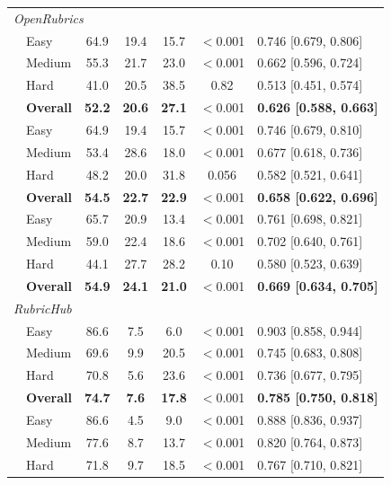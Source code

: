 \documentclass{article}
\begin{document}
\begin{table}[!h]
\begin{tabular}{llccccl}
\midrule
\multicolumn{7}{l}{\textit{OpenRubrics}} \\
\addlinespace[1pt]
\multirow{4}{*}{Qwen3-14B}
 & Easy    & 64.9 & 19.4 & 15.7 & $<$0.001 & 0.746 [0.679, 0.806] \\
 & Medium  & 55.3 & 21.7 & 23.0 & $<$0.001 & 0.662 [0.596, 0.724] \\
 & Hard    & 41.0 & 20.5 & 38.5 & 0.82     & 0.513 [0.451, 0.574] \\
 & \textbf{Overall} & \textbf{52.2} & \textbf{20.6} & \textbf{27.1} & $<$0.001 & \textbf{0.626 [0.588, 0.663]} \\
\addlinespace[3pt]
\multirow{4}{*}{Llama3-70B}
 & Easy    & 64.9 & 19.4 & 15.7 & $<$0.001 & 0.746 [0.679, 0.810] \\
 & Medium  & 53.4 & 28.6 & 18.0 & $<$0.001 & 0.677 [0.618, 0.736] \\
 & Hard    & 48.2 & 20.0 & 31.8 & 0.056    & 0.582 [0.521, 0.641] \\
 & \textbf{Overall} & \textbf{54.5} & \textbf{22.7} & \textbf{22.9} & $<$0.001 & \textbf{0.658 [0.622, 0.696]} \\
\addlinespace[3pt]
\multirow{4}{*}{GPT-4.1}
 & Easy    & 65.7 & 20.9 & 13.4 & $<$0.001 & 0.761 [0.698, 0.821] \\
 & Medium  & 59.0 & 22.4 & 18.6 & $<$0.001 & 0.702 [0.640, 0.761] \\
 & Hard    & 44.1 & 27.7 & 28.2 & 0.10     & 0.580 [0.523, 0.639] \\
 & \textbf{Overall} & \textbf{54.9} & \textbf{24.1} & \textbf{21.0} & $<$0.001 & \textbf{0.669 [0.634, 0.705]} \\
\midrule
\multicolumn{7}{l}{\textit{RubricHub}} \\
\addlinespace[1pt]
\multirow{4}{*}{Qwen3-14B}
 & Easy    & 86.6 &  7.5 &  6.0 & $<$0.001 & 0.903 [0.858, 0.944] \\
 & Medium  & 69.6 &  9.9 & 20.5 & $<$0.001 & 0.745 [0.683, 0.808] \\
 & Hard    & 70.8 &  5.6 & 23.6 & $<$0.001 & 0.736 [0.677, 0.795] \\
 & \textbf{Overall} & \textbf{74.7} & \textbf{7.6} & \textbf{17.8} & $<$0.001 & \textbf{0.785 [0.750, 0.818]} \\
\addlinespace[3pt]
\multirow{4}{*}{Llama3-70B}
 & Easy    & 86.6 &  4.5 &  9.0 & $<$0.001 & 0.888 [0.836, 0.937] \\
 & Medium  & 77.6 &  8.7 & 13.7 & $<$0.001 & 0.820 [0.764, 0.873] \\
 & Hard    & 71.8 &  9.7 & 18.5 & $<$0.001 & 0.767 [0.710, 0.821] \\

\end{tabular}
\end{table}
\end{document}
